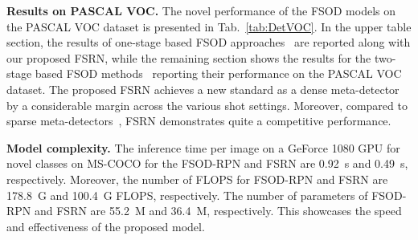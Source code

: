 \documentclass[10pt,twocolumn,letterpaper]{article}
\begin{document}
\textbf{Results on PASCAL VOC.} The novel performance of the FSOD models on the PASCAL VOC dataset is presented in Tab.~\ref{tab:DetVOC}. In the upper table section, the results of one-stage based FSOD approaches~\cite{FSRW, MetaDet, once} are reported along with our proposed FSRN, while the remaining section shows the results for the two-stage based FSOD methods~\cite{LSTD, MetaDet, MetaRCNN, TFA, MPSR, FsDetView, defrcn} reporting their performance on the PASCAL VOC dataset. The proposed FSRN achieves a new standard as a dense meta-detector by a considerable margin across the various shot settings. Moreover, compared to sparse meta-detectors~\cite{MetaRCNN, MetaDet, FsDetView}, FSRN demonstrates quite a competitive performance. 


\textbf{Model complexity.} The inference time per image on a GeForce 1080 GPU for novel classes on MS-COCO for the FSOD-RPN and FSRN are \SI{0.92}{\s} and  \SI{0.49}{\s}, respectively. Moreover, the number of FLOPS for FSOD-RPN and FSRN are  \SI{178.8}{G} and \SI{100.4}{G} FLOPS, respectively. The number of parameters of FSOD-RPN and FSRN are \SI{55.2}{M} and \SI{36.4}{M}, respectively. This showcases the speed and effectiveness of the proposed model.

\begin{table*}[t!]\caption{Ablation study on -shot MS-COCO. Every row represents an incremental contribution. }
\label{table:novel_abl}
\begin{center}
\end{center}
\vspace{-2em}
\end{table*} 
\end{document}
